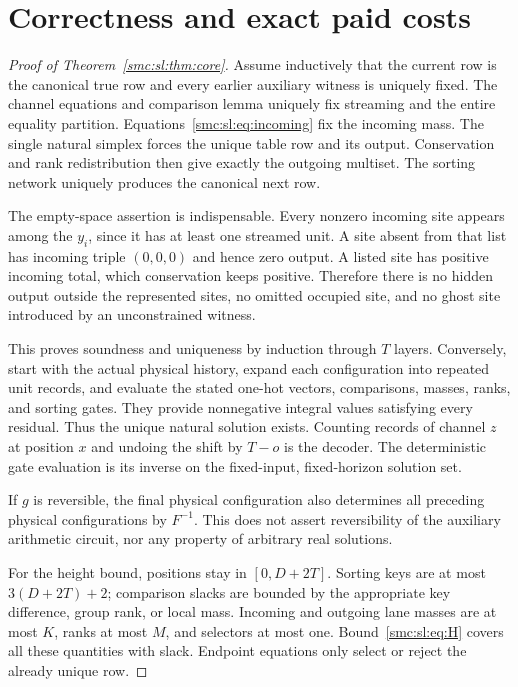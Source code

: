 \documentclass[11pt,letterpaper]{article}
\numberwithin{equation}{section}
\theoremstyle{definition}
\theoremstyle{remark}
\begin{document}
\section{Correctness and exact paid costs}\label{smc:sl:sec:proof}
\begin{proof}[Proof of Theorem~\ref{smc:sl:thm:core}]
Assume inductively that the current row is the canonical true row and every earlier auxiliary witness is uniquely fixed. The channel equations and comparison lemma uniquely fix streaming and the entire equality partition. Equations~\eqref{smc:sl:eq:incoming} fix the incoming mass. The single natural simplex forces the unique table row and its output. Conservation and rank redistribution then give exactly the outgoing multiset. The sorting network uniquely produces the canonical next row.

The empty-space assertion is indispensable. Every nonzero incoming site appears among the $y_i$, since it has at least one streamed unit. A site absent from that list has incoming triple $(0,0,0)$ and hence zero output. A listed site has positive incoming total, which conservation keeps positive. Therefore there is no hidden output outside the represented sites, no omitted occupied site, and no ghost site introduced by an unconstrained witness.

This proves soundness and uniqueness by induction through $T$ layers. Conversely, start with the actual physical history, expand each configuration into repeated unit records, and evaluate the stated one-hot vectors, comparisons, masses, ranks, and sorting gates. They provide nonnegative integral values satisfying every residual. Thus the unique natural solution exists. Counting records of channel $z$ at position $x$ and undoing the shift by $T-o$ is the decoder. The deterministic gate evaluation is its inverse on the fixed-input, fixed-horizon solution set.

If $g$ is reversible, the final physical configuration also determines all preceding physical configurations by $F^{-1}$. This does not assert reversibility of the auxiliary arithmetic circuit, nor any property of arbitrary real solutions.

For the height bound, positions stay in $[0,D+2T]$. Sorting keys are at most $3(D+2T)+2$; comparison slacks are bounded by the appropriate key difference, group rank, or local mass. Incoming and outgoing lane masses are at most $K$, ranks at most $M$, and selectors at most one. Bound~\eqref{smc:sl:eq:H} covers all these quantities with slack. Endpoint equations only select or reject the already unique row.
\end{proof}
\end{document}
